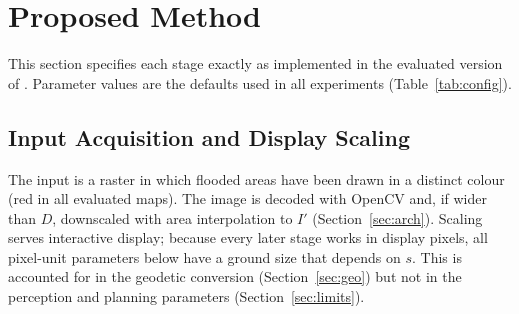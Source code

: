 \section{Proposed Method}
\label{sec:method}

This section specifies each stage exactly as implemented in the evaluated version of \adapt{}. Parameter values are the defaults used in all experiments (Table~\ref{tab:config}).

\subsection{Input Acquisition and Display Scaling}
The input is a raster in which flooded areas have been drawn in a distinct colour (red in all evaluated maps). The image is decoded with OpenCV and, if wider than $D$, downscaled with area interpolation to $I'$ (Section~\ref{sec:arch}). Scaling serves interactive display; because every later stage works in display pixels, all pixel-unit parameters below have a ground size that depends on $s$. This is accounted for in the geodetic conversion (Section~\ref{sec:geo}) but not in the perception and planning parameters (Section~\ref{sec:limits}).


